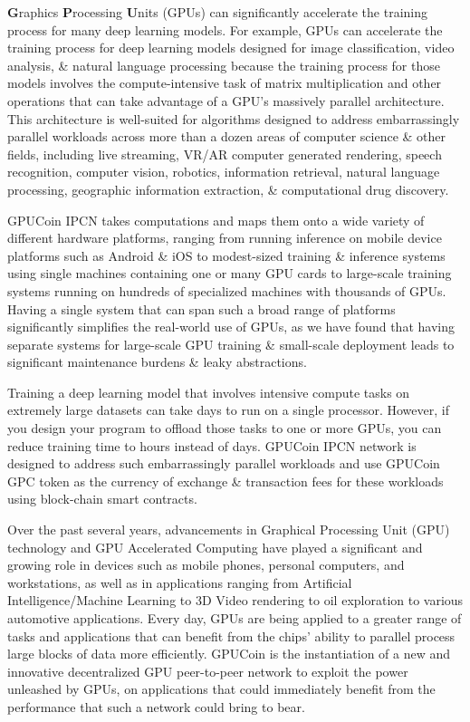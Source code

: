 \textbf{G}raphics \textbf{P}rocessing \textbf{U}nits (GPUs) can significantly accelerate the training process for many deep learning models. For example, GPUs can accelerate the training process for deep learning models designed for image classification, video analysis, \& natural language processing because the training process for those models involves the compute-intensive task of matrix multiplication and other operations that can take advantage of a GPU's massively parallel architecture. This architecture is well-suited for algorithms designed to address embarrassingly parallel workloads across more than a dozen areas of computer science \& other fields, including live streaming, VR/AR computer generated rendering, speech recognition, computer vision, robotics, information retrieval, natural language processing, geographic information extraction, \& computational drug discovery.

GPUCoin IPCN takes computations and maps them onto a wide variety of different hardware platforms, ranging from running inference on mobile device platforms such as Android \& iOS to modest-sized training \& inference systems using single machines containing one or many GPU cards to large-scale training systems running on hundreds of specialized machines with thousands of GPUs. Having a single system that can span such a broad range of platforms significantly simplifies the real-world use of GPUs, as we have found that having separate systems for large-scale GPU training \& small-scale deployment leads to significant maintenance burdens \& leaky abstractions.

Training a deep learning model that involves intensive compute tasks on extremely large datasets can take days to run on a single processor. However, if you design your program to offload those tasks to one or more GPUs, you can reduce training time to hours instead of days. GPUCoin IPCN network is designed to address such embarrassingly parallel workloads and use GPUCoin GPC token as the currency of exchange \& transaction fees for these workloads using block-chain smart contracts. 

Over the past several years, advancements in Graphical Processing Unit (GPU) technology and GPU Accelerated Computing have played a significant and growing role in devices such as mobile phones, personal computers, and workstations, as well as in applications ranging from Artificial Intelligence/Machine Learning to 3D Video rendering to oil exploration to various automotive applications.  Every day, GPUs are being applied to a greater range of tasks and applications that can benefit from the chips’ ability to parallel process large blocks of data more efficiently.  GPUCoin is the instantiation of a new and innovative decentralized GPU peer-to-peer network to exploit the power unleashed by GPUs, on applications that could immediately benefit from the performance that such a network could bring to bear.  

